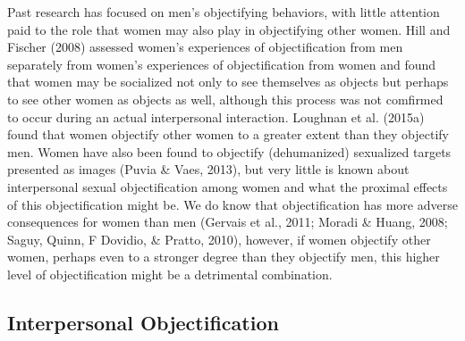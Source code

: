 \documentclass[man]{apa6}
\begin{document}
Past research has focused on men's objectifying behaviors, with little
attention paid to the role that women may also play in objectifying
other women. Hill and Fischer (2008) assessed women's experiences of
objectification from men separately from women's experiences of
objectification from women and found that women may be socialized not
only to see themselves as objects but perhaps to see other women as
objects as well, although this process was not comfirmed to occur during
an actual interpersonal interaction. Loughnan et al. (2015a) found that
women objectify other women to a greater extent than they objectify men.
Women have also been found to objectify (dehumanized) sexualized targets
presented as images (Puvia \& Vaes, 2013), but very little is known
about interpersonal sexual objectification among women and what the
proximal effects of this objectification might be. We do know that
objectification has more adverse consequences for women than men
(Gervais et al., 2011; Moradi \& Huang, 2008; Saguy, Quinn, F Dovidio,
\& Pratto, 2010), however, if women objectify other women, perhaps even
to a stronger degree than they objectify men, this higher level of
objectification might be a detrimental combination.

\subsection{Interpersonal
Objectification}\label{interpersonal-objectification}
\end{document}
